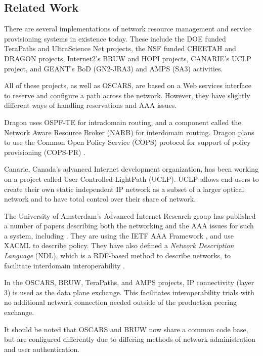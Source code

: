 \documentclass[conference]{IEEEtran}
\begin{document}
\subsection{Related Work}

There are several implementations of network resource management and
service provisioning systems in existence today.  These include the DOE funded
TeraPaths \cite{TeraPaths} and UltraScience Net \cite{USN} projects, the NSF funded CHEETAH \cite{CHEETAH} and
DRAGON \cite{DRAGON} projects,
Internet2's BRUW \cite{BRUW} and HOPI \cite{HOPI} projects, CANARIE's UCLP \cite{UCLP} 
project, and GEANT's
BoD (GN2-JRA3) \cite{GEANT} and AMPS (SA3) \cite{GEANT-AMPS} activities.

All of these projects, as well as OSCARS, are based on a Web services 
interface to reserve and configure a path across the network. However, they 
have slightly different ways of handling reservations and AAA issues.

Dragon uses OSPF-TE \cite{ospf-te} for intradomain routing, and a component called
the Network Aware Resource Broker (NARB) for interdomain routing.
Dragon plans to use the Common Open Policy Service (COPS) \cite{COPS}
protocol for support of policy provisioning (COPS-PR) \cite{COPS-PR}.

Canarie, Canada's advanced Internet development organization, has been
working on a project called User Controlled LightPath (UCLP).  UCLP
allows end-users to create their own static independent IP network as a subset
of a larger optical network and to have total control over their share
of network.

The University of Amsterdam's Advanced Internet Research group has
published a number of papers
describing both the networking and the AAA issues for such a system,
including \cite{gommans05} \cite{gommans06} \cite{demchenko} . 
They are using the IETF AAA Framework
\cite{AAA}, and use XACML \cite{XACML} to describe policy. They have also defined a
\emph{Network Description Language} (NDL), which is a RDF-based method to
describe networks, to facilitate interdomain interoperability \cite{ndl}.

In the OSCARS, BRUW, TeraPaths, and AMPS projects, IP connectivity (layer
3) is used as the data plane exchange.  This facilitates interoperability
trials with no additional network connection needed outside of the production
peering exchange.

It should be noted that OSCARS and BRUW now share a common code base, but
are configured differently due to differing methods of network administration
and user authentication.
\end{document}
